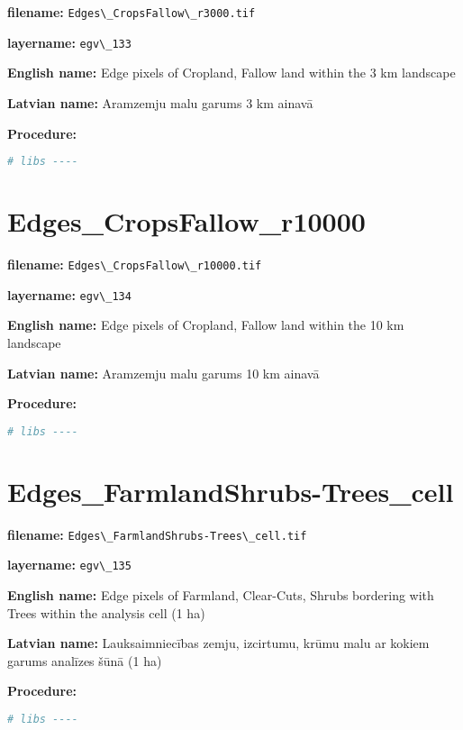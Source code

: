 \documentclass[
]{book}
\newcommand{\passthrough}[1]{#1}
\begin{document}
\textbf{filename:} \passthrough{\lstinline!Edges\_CropsFallow\_r3000.tif!}

\textbf{layername:} \passthrough{\lstinline!egv\_133!}

\textbf{English name:} Edge pixels of Cropland, Fallow land within the 3 km landscape

\textbf{Latvian name:} Aramzemju malu garums 3 km ainavā

\textbf{Procedure:}

\begin{lstlisting}[language=R]
# libs ----
\end{lstlisting}

\section{Edges\_CropsFallow\_r10000}\label{ch06.134}

\textbf{filename:} \passthrough{\lstinline!Edges\_CropsFallow\_r10000.tif!}

\textbf{layername:} \passthrough{\lstinline!egv\_134!}

\textbf{English name:} Edge pixels of Cropland, Fallow land within the 10 km landscape

\textbf{Latvian name:} Aramzemju malu garums 10 km ainavā

\textbf{Procedure:}

\begin{lstlisting}[language=R]
# libs ----
\end{lstlisting}

\section{Edges\_FarmlandShrubs-Trees\_cell}\label{ch06.135}

\textbf{filename:} \passthrough{\lstinline!Edges\_FarmlandShrubs-Trees\_cell.tif!}

\textbf{layername:} \passthrough{\lstinline!egv\_135!}

\textbf{English name:} Edge pixels of Farmland, Clear-Cuts, Shrubs bordering with Trees within the analysis cell (1 ha)

\textbf{Latvian name:} Lauksaimniecības zemju, izcirtumu, krūmu malu ar kokiem garums analīzes šūnā (1 ha)

\textbf{Procedure:}

\begin{lstlisting}[language=R]
# libs ----
\end{lstlisting}
\end{document}

